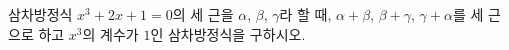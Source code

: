 삼차방정식 $x^3+2x+1=0$의 세 근을 $\alpha$, $\beta$, $\gamma$라 할 때, $\alpha+\beta$, $\beta+\gamma$, $\gamma+\alpha$를 세 근으로 하고 $x^3$의 계수가 $1$인 삼차방정식을 구하시오.

